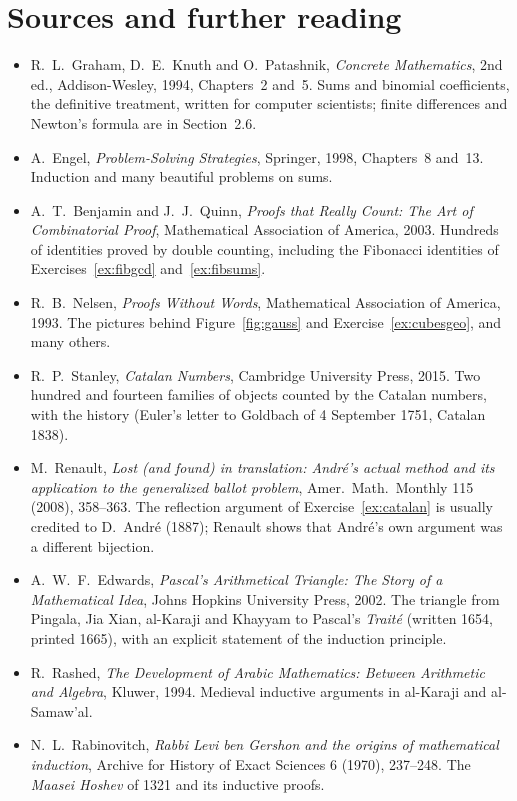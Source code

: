 \section*{Sources and further reading}

\begin{itemize}\raggedright
\item R.~L.~Graham, D.~E.~Knuth and O.~Patashnik, \emph{Concrete Mathematics}, 2nd ed., Addison-Wesley, 1994, Chapters~2 and~5. Sums and binomial coefficients, the definitive treatment, written for computer scientists; finite differences and Newton's formula are in Section~2.6.
\item A.~Engel, \emph{Problem-Solving Strategies}, Springer, 1998, Chapters~8 and~13. Induction and many beautiful problems on sums.
\item A.~T.~Benjamin and J.~J.~Quinn, \emph{Proofs that Really Count: The Art of Combinatorial Proof}, Mathematical Association of America, 2003. Hundreds of identities proved by double counting, including the Fibonacci identities of Exercises~\ref{ex:fibgcd} and~\ref{ex:fibsums}.
\item R.~B.~Nelsen, \emph{Proofs Without Words}, Mathematical Association of America, 1993. The pictures behind Figure~\ref{fig:gauss} and Exercise~\ref{ex:cubesgeo}, and many others.
\item R.~P.~Stanley, \emph{Catalan Numbers}, Cambridge University Press, 2015. Two hundred and fourteen families of objects counted by the Catalan numbers, with the history (Euler's letter to Goldbach of 4 September 1751, Catalan 1838).
\item M.~Renault, \emph{Lost (and found) in translation: Andr\'e's actual method and its application to the generalized ballot problem}, Amer.\ Math.\ Monthly 115 (2008), 358--363. The reflection argument of Exercise~\ref{ex:catalan} is usually credited to D.~Andr\'e (1887); Renault shows that Andr\'e's own argument was a different bijection.
\item A.~W.~F.~Edwards, \emph{Pascal's Arithmetical Triangle: The Story of a Mathematical Idea}, Johns Hopkins University Press, 2002. The triangle from Pingala, Jia Xian, al-Karaji and Khayyam to Pascal's \emph{Trait\'e} (written 1654, printed 1665), with an explicit statement of the induction principle.
\item R.~Rashed, \emph{The Development of Arabic Mathematics: Between Arithmetic and Algebra}, Kluwer, 1994. Medieval inductive arguments in al-Karaji and al-Samaw'al.
\item N.~L.~Rabinovitch, \emph{Rabbi Levi ben Gershon and the origins of mathematical induction}, Archive for History of Exact Sciences 6 (1970), 237--248. The \emph{Maasei Hoshev} of 1321 and its inductive proofs.

\end{itemize}
